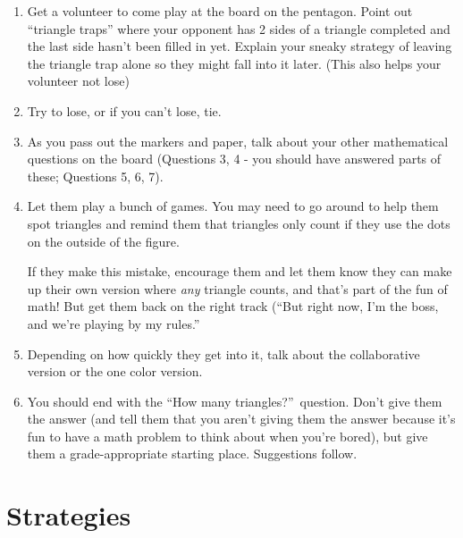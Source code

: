 \documentclass{article}
\begin{document}
\begin{enumerate}
            \item Get a volunteer to come play at the board on the pentagon. Point out ``triangle traps'' where your opponent has 2 sides of a triangle completed and the last side hasn't been filled in yet. Explain your sneaky strategy of leaving the triangle trap alone so they might fall into it later. (This also helps your volunteer not lose)
            
            \item Try to lose, or if you can't lose, tie.
            
            \item As you pass out the markers and paper, talk about your other mathematical questions on the board (Questions 3, 4 - you should have answered parts of these; Questions 5, 6, 7).
            
            \item Let them play a bunch of games. You may need to go around to help them spot triangles and remind them that triangles only count if they use the dots on the outside of the figure. 
            
            If they make this mistake, encourage them and let them know they can make up their own version where \textit{any} triangle counts, and that's part of the fun of math! But get them back on the right track (``But right now, I'm the boss, and we're playing by my rules.''
            
            \item Depending on how quickly they get into it, talk about the collaborative version or the one color version.
            
            \item You should end with the ``How many triangles?''\ question. Don't give them the answer (and tell them that you aren't giving them the answer because it's fun to have a math problem to think about when you're bored), but give them a grade-appropriate starting place. Suggestions follow.
        \end{enumerate}
    
    \clearpage
    
    \section{Strategies}
    
\end{document}
